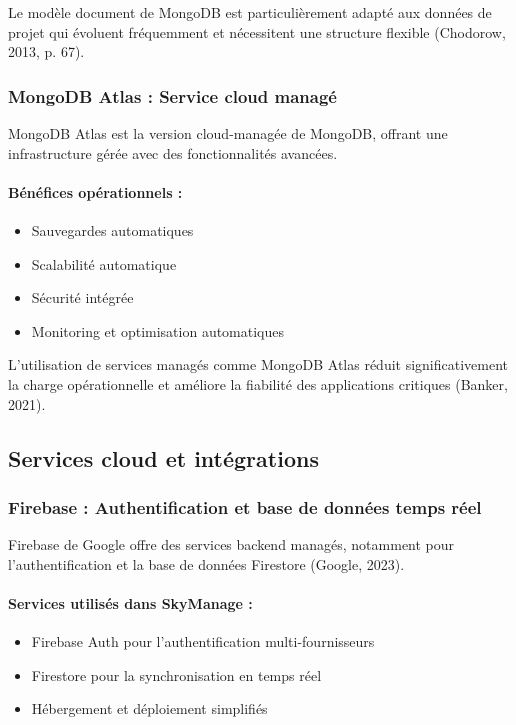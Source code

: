 Le modèle document de MongoDB est particulièrement adapté aux données de projet qui évoluent fréquemment et nécessitent une structure flexible (Chodorow, 2013, p. 67).

\subsubsection{MongoDB Atlas : Service cloud managé}
MongoDB Atlas est la version cloud-managée de MongoDB, offrant une infrastructure gérée avec des fonctionnalités avancées.

\paragraph{Bénéfices opérationnels :}
\begin{itemize}
    \item Sauvegardes automatiques
    \item Scalabilité automatique
    \item Sécurité intégrée
    \item Monitoring et optimisation automatiques
\end{itemize}

L'utilisation de services managés comme MongoDB Atlas réduit significativement la charge opérationnelle et améliore la fiabilité des applications critiques (Banker, 2021).

\subsection{Services cloud et intégrations}

\subsubsection{Firebase : Authentification et base de données temps réel}
Firebase de Google offre des services backend managés, notamment pour l'authentification et la base de données Firestore (Google, 2023).

\paragraph{Services utilisés dans SkyManage :}
\begin{itemize}
    \item Firebase Auth pour l'authentification multi-fournisseurs
    \item Firestore pour la synchronisation en temps réel
    \item Hébergement et déploiement simplifiés
\end{itemize}

